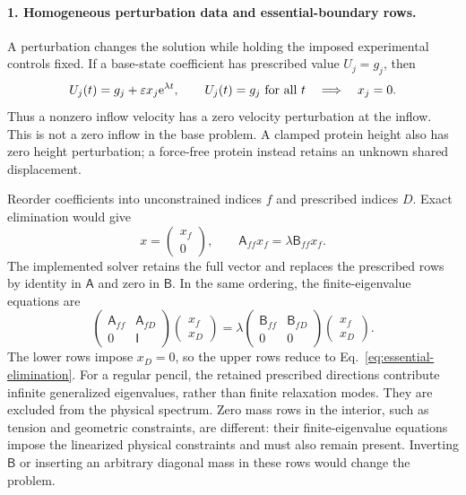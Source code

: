 \paragraph{1. Homogeneous perturbation data and essential-boundary rows.}
A perturbation changes the solution while holding the imposed experimental controls fixed. If a base-state coefficient has prescribed value $U_j=g_j$, then
\begin{equation}
U_j(t)=g_j+\varepsilon x_j\mathrm{e}^{\lambda t},\qquad
U_j(t)=g_j\ \text{for all }t
\quad\Longrightarrow\quad x_j=0.
\label{eq:homogeneous-perturbation}
\end{equation}
Thus a nonzero inflow velocity has a zero velocity perturbation at the inflow. This is not a zero inflow in the base problem. A clamped protein height also has zero height perturbation; a force-free protein instead retains an unknown shared displacement.

Reorder coefficients into unconstrained indices $f$ and prescribed indices $D$. Exact elimination would give
\begin{equation}
x=\begin{pmatrix}x_f\\0\end{pmatrix},\qquad
\mathsf A_{ff}x_f=\lambda\mathsf B_{ff}x_f.
\label{eq:essential-elimination}
\end{equation}
The implemented solver retains the full vector and replaces the prescribed rows by identity in $\mathsf A$ and zero in $\mathsf B$. In the same ordering, the finite-eigenvalue equations are
\begin{equation}
\begin{pmatrix}\mathsf A_{ff}&\mathsf A_{fD}\\0&\mathsf I\end{pmatrix}
\begin{pmatrix}x_f\\x_D\end{pmatrix}
=\lambda
\begin{pmatrix}\mathsf B_{ff}&\mathsf B_{fD}\\0&0\end{pmatrix}
\begin{pmatrix}x_f\\x_D\end{pmatrix}.
\label{eq:boundary-identity-rows}
\end{equation}
The lower rows impose $x_D=0$, so the upper rows reduce to Eq.~\eqref{eq:essential-elimination}. For a regular pencil, the retained prescribed directions contribute infinite generalized eigenvalues, rather than finite relaxation modes. They are excluded from the physical spectrum. Zero mass rows in the interior, such as tension and geometric constraints, are different: their finite-eigenvalue equations impose the linearized physical constraints and must also remain present. Inverting $\mathsf B$ or inserting an arbitrary diagonal mass in these rows would change the problem.

